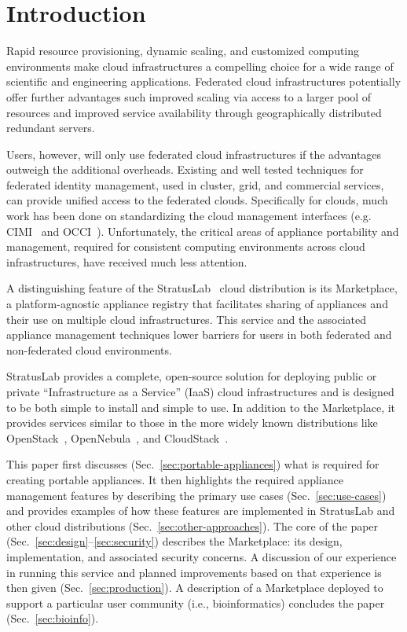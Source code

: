 \section{Introduction}
\label{sec:Introduction}

Rapid resource provisioning, dynamic scaling, and customized computing
environments make cloud infrastructures a compelling choice for a wide
range of scientific and engineering applications.  Federated cloud
infrastructures potentially offer further advantages such improved
scaling via access to a larger pool of resources and improved service
availability through geographically distributed redundant servers.

Users, however, will only use federated cloud infrastructures if the
advantages outweigh the additional overheads.  Existing and well
tested techniques for federated identity management, used in cluster,
grid, and commercial services, can provide unified access to the
federated clouds.  Specifically for clouds, much work has been done on
standardizing the cloud management interfaces (e.g. CIMI~\cite{cimi}
and OCCI~\cite{occi}).  Unfortunately, the critical areas of appliance
portability and management, required for consistent computing
environments across cloud infrastructures, have received much less
attention.

A distinguishing feature of the StratusLab~\cite{slbook} cloud
distribution is its Marketplace, a platform-agnostic appliance
registry that facilitates sharing of appliances and their use on
multiple cloud infrastructures.  This service and the associated
appliance management techniques lower barriers for users in both
federated and non-federated cloud environments.

StratusLab provides a complete, open-source solution for deploying
public or private ``Infrastructure as a Service'' (IaaS) cloud
infrastructures and is designed to be both simple to install and
simple to use.  In addition to the Marketplace, it provides services
similar to those in the more widely known distributions like
OpenStack~\cite{openstack}, OpenNebula~\cite{one}, and
CloudStack~\cite{cloudstack}.

This paper first discusses (Sec.~\ref{sec:portable-appliances}) what
is required for creating portable appliances. It then highlights the
required appliance management features by describing the primary use
cases (Sec.~\ref{sec:use-cases}) and provides examples of how these
features are implemented in StratusLab and other cloud distributions
(Sec.~\ref{sec:other-approaches}).  The core of the paper
(Sec.~\ref{sec:design}--\ref{sec:security}) describes the Marketplace:
its design, implementation, and associated security concerns.  A
discussion of our experience in running this service and planned
improvements based on that experience is then given
(Sec.~\ref{sec:production}). A description of a Marketplace deployed
to support a particular user community (i.e., bioinformatics)
concludes the paper (Sec.~\ref{sec:bioinfo}).
